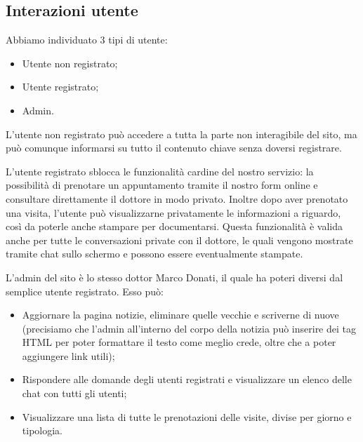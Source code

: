 \subsection{Interazioni utente}

Abbiamo individuato 3 tipi di utente:
\begin{itemize}
\item Utente non registrato;
\item Utente registrato;
\item Admin.
\end{itemize}

L’utente non registrato può accedere a tutta la parte non interagibile del sito, ma può comunque informarsi su tutto il contenuto chiave senza doversi registrare.

L’utente registrato sblocca le funzionalità cardine del nostro servizio: la possibilità di prenotare un appuntamento tramite il nostro form online e consultare direttamente il dottore in modo privato.
Inoltre dopo aver prenotato una visita, l’utente può visualizzarne privatamente le informazioni a riguardo, così da poterle anche stampare per documentarsi.
Questa funzionalità è valida anche per tutte le conversazioni private con il dottore, le quali vengono mostrate tramite chat sullo schermo e possono essere eventualmente stampate.

L’admin del sito è lo stesso dottor Marco Donati, il quale ha poteri diversi dal semplice utente registrato. Esso può:

\begin{itemize}
\item Aggiornare la pagina notizie, eliminare quelle vecchie e scriverne di nuove (precisiamo che l'admin all'interno del corpo della notizia può inserire dei tag HTML per poter formattare il testo come meglio crede, oltre che  a poter aggiungere link utili);
\item Rispondere alle domande degli utenti registrati e visualizzare un elenco delle chat con tutti gli utenti;
\item Visualizzare una lista di tutte le prenotazioni delle visite, divise per giorno e tipologia.
\end{itemize}


